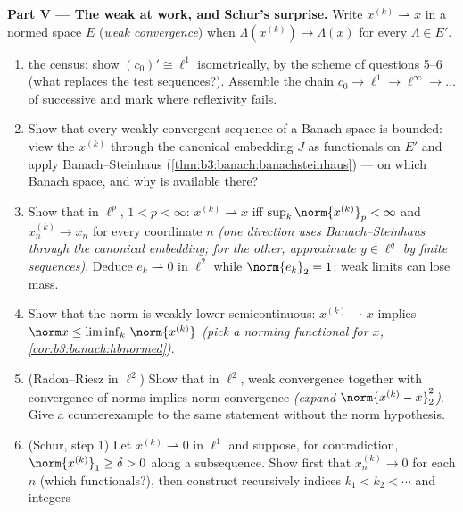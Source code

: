 \begin{problem}[{Weekend problem --- $(\ell^p)' = \ell^q$,
reflexivity, and the strangeness of $\ell^\infty$}]
\medskip
\noindent\textbf{Part V --- The weak  at work, and
Schur's surprise.} Write $x^{(k)} \rightharpoonup x$ in a
normed space $E$ (\emph{weak convergence}) when
$\Lambda(x^{(k)}) \to \Lambda(x)$ for every $\Lambda \in E'$.
\begin{enumerate}[resume]
  \item {} the census: show $(c_0)' \cong \ell^1$
        isometrically, by the scheme of questions 5--6 (what
        replaces the test sequences?). Assemble the chain
        $c_0 \to \ell^1 \to \ell^\infty \to \dots$ of
        successive  and mark where reflexivity fails.
  \item Show that every weakly convergent sequence of a Banach
        space is bounded: view the $x^{(k)}$ through the
        canonical embedding $J$ as functionals on $E'$ and
        apply Banach--Steinhaus
        (\cref{thm:b3:banach:banachsteinhaus}) --- on which
        Banach space, and why is  available there?
  \item Show that in $\ell^p$, $1 < p < \infty$: $x^{(k)}
        \rightharpoonup x$ iff $\sup_k\norm{x^{(k)}}_p <
        \infty$ and $x^{(k)}_n \to x_n$ for every coordinate
        $n$ \emph{(one direction uses Banach--Steinhaus through
        the canonical embedding; for the other, approximate $y
        \in \ell^q$ by finite sequences)}. Deduce $e_k
        \rightharpoonup 0$ in $\ell^2$ while $\norm{e_k}_2 =
        1$: weak limits can lose mass.
  \item Show that the norm is weakly lower semicontinuous:
        $x^{(k)} \rightharpoonup x$ implies $\norm x \leq
        \liminf_k\,\norm{x^{(k)}}$ \emph{(pick a norming
        functional for $x$, \cref{cor:b3:banach:hbnormed})}.
  \item (Radon--Riesz in $\ell^2$) Show that in $\ell^2$, weak
        convergence together with convergence of norms implies
        norm convergence \emph{(expand $\norm{x^{(k)} -
        x}_2^2$)}. Give a counterexample to the same statement
        without the norm hypothesis.
  \item (Schur, step 1) Let $x^{(k)} \rightharpoonup 0$ in
        $\ell^1$ and suppose, for contradiction,
        $\norm{x^{(k)}}_1 \geq \delta > 0$ along a
        subsequence. Show first that $x^{(k)}_n \to 0$ for
        each $n$ (which functionals?), then construct
        recursively indices $k_1 < k_2 < \cdots$ and integers

\end{enumerate}
\end{problem}
